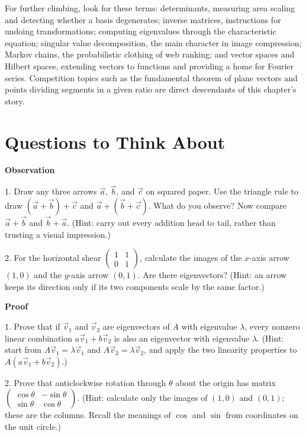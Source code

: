 \begin{pandeng}
For further climbing, look for these terms: determinants, measuring area scaling and detecting whether a basis degenerates; inverse matrices, instructions for undoing transformations; computing eigenvalues through the characteristic equation; singular value decomposition, the main character in image compression; Markov chains, the probabilistic clothing of web ranking; and vector spaces and Hilbert spaces, extending vectors to functions and providing a home for Fourier series. Competition topics such as the fundamental theorem of plane vectors and points dividing segments in a given ratio are direct descendants of this chapter's story.
\end{pandeng}

\section*{Questions to Think About}

\textbf{Observation}

1. Draw any three arrows $\vec{a}$, $\vec{b}$, and $\vec{c}$ on squared paper. Use the triangle rule to draw $(\vec{a}+\vec{b})+\vec{c}$ and $\vec{a}+(\vec{b}+\vec{c})$. What do you observe? Now compare $\vec{a}+\vec{b}$ and $\vec{b}+\vec{a}$. (Hint: carry out every addition head to tail, rather than trusting a visual impression.)

2. For the horizontal shear $\begin{pmatrix}1&1\\0&1\end{pmatrix}$, calculate the images of the $x$-axis arrow $(1,0)$ and the $y$-axis arrow $(0,1)$. Are there eigenvectors? (Hint: an arrow keeps its direction only if its two components scale by the same factor.)

\textbf{Proof}

1. Prove that if $\vec{v}_1$ and $\vec{v}_2$ are eigenvectors of $A$ with eigenvalue $\lambda$, every nonzero linear combination $a\vec{v}_1+b\vec{v}_2$ is also an eigenvector with eigenvalue $\lambda$. (Hint: start from $A\vec{v}_1=\lambda\vec{v}_1$ and $A\vec{v}_2=\lambda\vec{v}_2$, and apply the two linearity properties to $A(a\vec{v}_1+b\vec{v}_2)$.)

2. Prove that anticlockwise rotation through $\theta$ about the origin has matrix $\begin{pmatrix}\cos\theta&-\sin\theta\\ \sin\theta&\cos\theta\end{pmatrix}$. (Hint: calculate only the images of $(1,0)$ and $(0,1)$; these are the columns. Recall the meanings of $\cos$ and $\sin$ from coordinates on the unit circle.)

